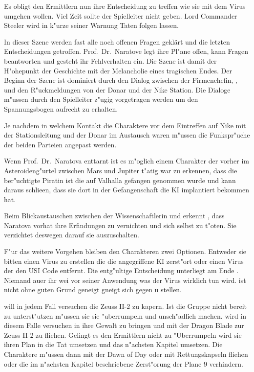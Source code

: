 Es obligt den Ermittlern nun ihre Entscheidung zu treffen wie sie mit dem Virus umgehen wollen. Viel Zeit sollte der Spielleiter nicht geben. Lord Commander Steeler wird in k"urze seiner Warnung Taten folgen lassen.

\vfill
\newpage

\begin{remarks}
	In dieser Szene werden fast alle noch offenen Fragen geklärt und die letzten Entscheidungen getroffen. Prof.~Dr.~Naratove legt ihre Pl"ane offen, kann Fragen beantworten und gesteht ihr Fehlverhalten ein. Die Szene ist damit der H"ohepunkt der Geschichte mit der Melancholie eines tragischen Endes. Der Beginn der Szene ist dominiert durch den Dialog zwischen der Firmenchefin, \xl{}, \ml{} und den R"uckmeldungen von der Donar und der Nike Station. Die Dialoge m"ussen durch den Spielleiter z"ugig vorgetragen werden um den Spannungsbogen aufrecht zu erhalten.

	Je nachdem in welchem Kontakt die Charaktere vor dem Eintreffen auf Nike mit der Stationsleitung und der Donar im Austausch waren m"ussen die Funkspr"uche der beiden Parteien angepast werden.

	Wenn Prof.~Dr.~Naratova \xl{} enttarnt ist es m"oglich einem Charakter der vorher im Asteroideng"urtel zwischen Mars und Jupiter t"atig war zu erkennen, dass \xl{} die ber"uchtigte Piratin ist die auf Valhalla gefangen genommen wurde und kann daraus schlie\3en, dass sie dort in der Gefangenschaft die KI implantiert bekommen hat.

	Beim Blickaustauschen zwischen der Wissenschaftlerin und \xl{} erkennt \xl{}, dass Naratova vorhat ihre Erfindungen zu vernichten und sich selbst zu t"oten. Sie verzichtet deswegen darauf sie auszuschalten.

	F"ur das weitere Vorgehen bleiben den Charakteren zwei Optionen. Entweder sie bitten \ml{} einen Virus zu erstellen die die angegriffene KI zerst"ort oder einen Virus der den USI Code entfernt. Die entg"ultige Entscheidung unterliegt am Ende \ml{}. Niemand au\3er ihr wei\3 vor seiner Anwendung was der Virus wirklich tun wird. \ml{} ist  nicht ohne guten Grund geneigt gneigt sich gegen \xl{} u stellen. 
	
	\xl{} will in jedem Fall versuchen die Zeuss II-2 zu kapern. Ist die Gruppe nicht bereit \xl{} zu unterst"utzen m"ussen sie sie "uberrumpeln und unsch"adlich machen. \xl{} wird in diesem Falle versuchen \ml{} in ihre Gewalt zu bringen und mit der Dragon Blade zur Zeuss II-2 zu fliehen. Gelingt es den Ermittlern nicht \xl{} zu "Uberrumpeln wird sie ihren Plan in die Tat umsetzen und das  n"achsten Kapitel umsetzen. Die Charaktere m"ussen dann mit der Dawn of Day oder mit Rettungskapseln fliehen oder die im n"achsten Kapitel beschriebene Zerst"orung der Plane 9 verhindern.
\end{remarks}

